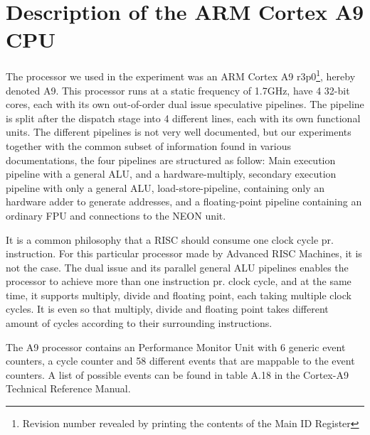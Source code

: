 \section{Description of the ARM Cortex A9 CPU}


The processor we used in the experiment was an ARM Cortex A9
r3p0\footnote{Revision number revealed by printing the contents of the Main ID
Register}, hereby denoted A9. This processor runs at a static frequency of
1.7GHz, have 4 32-bit cores, each with its own out-of-order dual issue
speculative pipelines\cite{armtech}. The pipeline is split after the dispatch
stage into 4 different lines, each with its own functional units. The different
pipelines is not very well documented, but our experiments together with the
common subset of information found in various
documentations\cite{armtech}\cite{7cpu}\cite{lotofdocs}, the four pipelines are
structured as follow: Main execution pipeline with a  general ALU, and a
hardware-multiply, secondary execution pipeline with only a general ALU,
load-store-pipeline, containing only an hardware adder to generate addresses,
and a floating-point pipeline containing an ordinary FPU and connections to the
NEON unit.

It is a common philosophy that a RISC should consume one clock cycle pr.
instruction\cite{unknown}.  For this particular processor made by Advanced RISC
Machines, it is not the case. The dual issue and its parallel general ALU
pipelines enables the processor to achieve more than one instruction pr. clock
cycle, and at the same time, it supports multiply, divide and floating point,
each taking multiple clock cycles. It is even so that multiply, divide and
floating point takes different amount of cycles according to their surrounding
instructions.

The A9 processor contains an Performance Monitor Unit with 6 generic event
counters, a cycle counter and 58 different events that are mappable to the event
counters\cite{armtech}. A list of possible events can be found in table A.18 in
the Cortex-A9 Technical Reference Manual\cite{armtech}.


